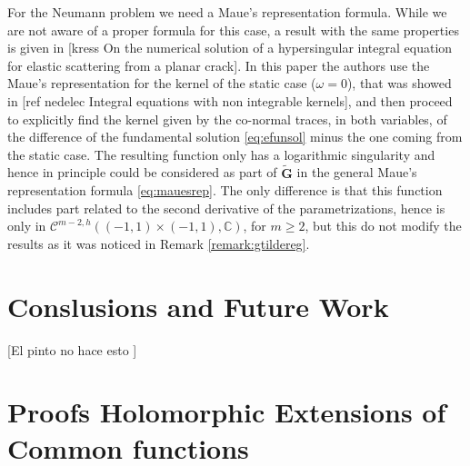 \documentclass{article}
\newcommand{\todo}[1]{{\color{red}[#1]}}
\newcommand{\IC}{{\mathbb C}}
\newcommand{\cmspaceh}[4]{\mathcal{C}^{#1,#2} \left( #3, #4 \right)}
\newcommand{\iinterv}{(-1,1)\times(-1,1)}
\begin{document}
For the Neumann problem we need a Maue's representation formula. While we are not aware of a proper formula for this case, a result with the same properties is given in \todo{kress On the numerical solution of a hypersingular integral equation for elastic scattering from a planar crack}. In this paper the authors use the Maue's representation for the kernel of the static case ($\omega = 0$), that was showed in \todo{ref nedelec Integral equations with non integrable kernels}, and then proceed to explicitly find the kernel given by the co-normal traces, in both variables, of the difference of the fundamental solution \eqref{eq:efunsol}  minus the one coming from the static case. The resulting function only has a logarithmic singularity and hence in principle could be considered as part of $\widetilde{\mathbf{G}}$ in the general Maue's representation formula \eqref{eq:mauesrep}. The only difference is that this function includes part related to the second derivative of the parametrizations, hence is only in $\cmspaceh{m-2}{h}{\iinterv}{\IC}$, for $m\geq 2$, but this do not modify the results as it was noticed in Remark \ref{remark:gtildereg}. 

\section{Conslusions and Future Work}
\todo{El pinto no hace esto }




\appendix
\section{Proofs Holomorphic Extensions of Common functions }
\label{appendix:funext}
\end{document}
